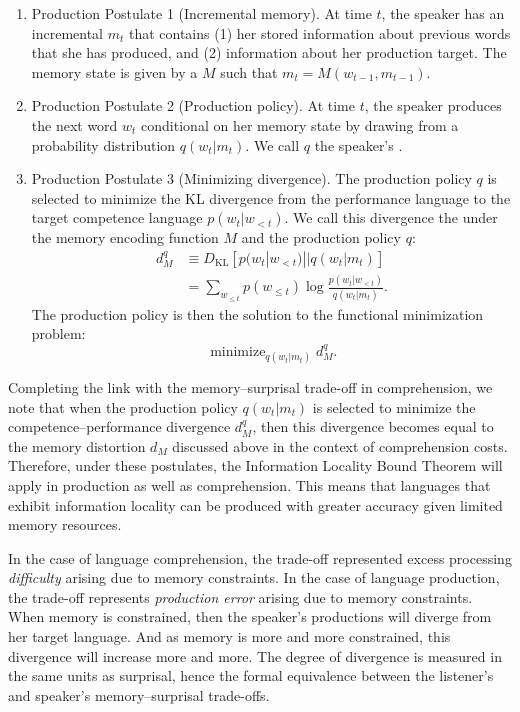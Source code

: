 \begin{enumerate}
    \item Production Postulate 1 (Incremental memory). At time $t$, the speaker has an incremental  $m_t$ that contains (1) her stored information about previous words that she has produced, and (2) information about her production target. The memory state is given by a  $M$ such that $m_t = M(w_{t-1}, m_{t-1})$.
    
    \item Production Postulate 2 (Production policy). At time $t$, the speaker produces the next word $w_t$ conditional on her memory state by drawing from a probability distribution $q(w_t | m_t)$. We call $q$ the speaker's .
    
    \item Production Postulate 3 (Minimizing divergence). The production policy $q$ is selected to minimize the KL divergence from the performance language to the target competence language $p(w_t|w_{<t})$. We call this divergence the  under the memory encoding function $M$ and the production policy $q$:
    \begin{align}
    \label{eq:comp-perf-div}
    d^q_M &\equiv D_{\text{KL}} [ p(w_t|w_{<t}) || q(w_t|m_t) ] \\
        &= \sum_{w_{\le t}} p(w_{\le t}) \log \frac{p(w_t | w_{<t})}{q(w_t|m_t)}.
    \end{align}
    The production policy is then the solution to the functional minimization problem:
    \begin{equation}
        \mathop{\text{minimize }}_{q(w_t|m_t)} d^q_M.
    \end{equation}
\end{enumerate}

Completing the link with the memory--surprisal trade-off in comprehension, we note that when the production policy $q(w_t|m_t)$ is selected to minimize the competence--performance divergence $d^q_M$, then this divergence becomes equal to the memory distortion $d_M$ discussed above in the context of comprehension costs. Therefore, under these postulates, the Information Locality Bound Theorem will apply in production as well as comprehension. This means that languages that exhibit information locality can be produced with greater accuracy given limited memory resources.

In the case of language comprehension, the trade-off represented excess processing \emph{difficulty} arising due to memory constraints. In the case of language production, the trade-off represents \emph{production error} arising due to memory constraints. When memory is constrained, then the speaker's productions will diverge from her target language. And as memory is more and more constrained, this divergence will increase more and more. The degree of divergence is measured in the same units as surprisal, hence the formal equivalence between the listener's and speaker's memory--surprisal trade-offs. 

